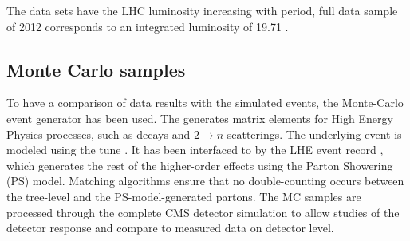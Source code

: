 The data sets have the LHC luminosity increasing with period, full data sample of 2012 corresponds to an integrated luminosity of 19.71 \fbinv. 

\subsection{Monte Carlo samples}
To have a comparison of data results with the simulated events, the \MadGraphF \cite{Alwall:2011uj} Monte-Carlo event generator has been used. The \MadGraphF generates matrix elements for High Energy Physics processes, such as decays and $2 \rightarrow n$ scatterings. The underlying event is modeled using the tune \Ztwostar. It has been interfaced to \PYTHIAS \cite{Sjostrand:2006za} by the LHE event record \cite{Alwall:2006yp}, which generates the rest of the higher-order effects using the Parton Showering (PS) model. Matching algorithms ensure that no double-counting occurs between the tree-level and the PS-model-generated partons. The MC samples are processed through the complete CMS detector simulation to allow studies of the detector response and compare to measured data on detector level.

